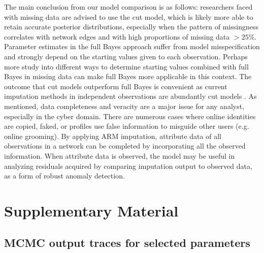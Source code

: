 \documentclass{article}
\newcommand{\beginsupplement}{%
        \setcounter{table}{0}
        \renewcommand{\thetable}{S\arabic{table}}%
        \setcounter{figure}{0}
        \renewcommand{\thefigure}{S\arabic{figure}}%
}
\begin{document}
The main conclusion from our model comparison is as follows: researchers faced with missing data are advised to use the cut model, which is likely more able to retain accurate posterior distributions, especially when the pattern of missingness correlates with network edges and with high proportions of missing data $>25\%$. Parameter estimates in the full Bayes approach suffer from model misspecification and strongly depend on the starting values given to each observation. Perhaps more study into different ways to determine starting values combined with full Bayes in missing data can make full Bayes more applicable in this context. The outcome that cut models outperform full Bayes is convenient as current imputation methods in independent observations are abundantly cut models \cite{buuren2010mice}. As mentioned, data completeness and veracity are a major issue for any analyst, especially in the cyber domain. There are numerous cases where online identities are copied, faked, or profiles use false information to misguide other users (e.g. online grooming). By applying ARM imputation, attribute data of all observations in a network can be completed by incorporating all the observed information. When attribute data is observed, the model may be useful in analyzing residuals acquired by comparing imputation output to observed data, as a form of robust anomaly detection.





\newpage
\section{Supplementary Material}
\beginsupplement

\subsection{MCMC output traces for selected parameters}\label{sec:mcmcoutput}
\end{document}
